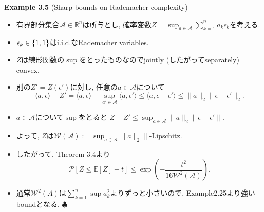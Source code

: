 \documentclass[aspectratio=169, dvipdfmx]{beamer}
\def\endexample{\hfill $\clubsuit$}
\newcommand{\ex}{\mathbb{E}}
\begin{document}
\begin{frame}{}{}
{\bf Example 3.5} (Sharp bounds on Rademacher complexity)
    \begin{itemize}
        \item 有界部分集合$\mathcal{A}\in\mathbb{R}^n$は所与とし,
        確率変数$Z = \sup_{a\in\mathcal{A}}\sum_{k=1}^na_k\epsilon_k$を考える.
        \item $\epsilon_k \in \{\-1,1\}$はi.i.d.なRademacher variables.
        \item $Z$は線形関数の$\sup$をとったものなのでjointly (したがってseparately) convex.
        \item 別の$Z' = Z(\epsilon')$に対し, 任意の$a\in\mathcal{A}$について
        \[
            \langle a,\epsilon\rangle - Z'
            = \langle a,\epsilon\rangle - \sup_{a'\in\mathcal{A}}\langle a,\epsilon'\rangle
            \le \langle a, \epsilon-\epsilon'\rangle
            \le \|a\|_2 \|\epsilon-\epsilon'\|_2.
        \]
        \item $a\in \mathcal{A}$について$\sup$をとると
        $Z-Z' \le \sup_{a\in\mathcal{A}}\|a\|_2\|\epsilon-\epsilon'\|$.
        \item よって, $Z$は$\mathcal{W}(\mathcal{A}):=\sup_{a\in\mathcal{A}}\|a\|_2\|$-Lipschitz.
        \item したがって, Theorem 3.4より
        \[ \mathcal{P}[Z \le \ex[Z]+t] \le \exp\left(-\frac{t^2}{16\mathcal{W}^2(\mathcal{A})}\right).
        \tag{3.17}\label{3.17}\]
        \item 通常$\mathcal{W}^2(A)$は$\sum_{k=1}^n\sup a_k^2$よりずっと小さいので, Example2.25より強いboundとなる.
        \endexample
    \end{itemize}
\end{frame}
\end{document}
